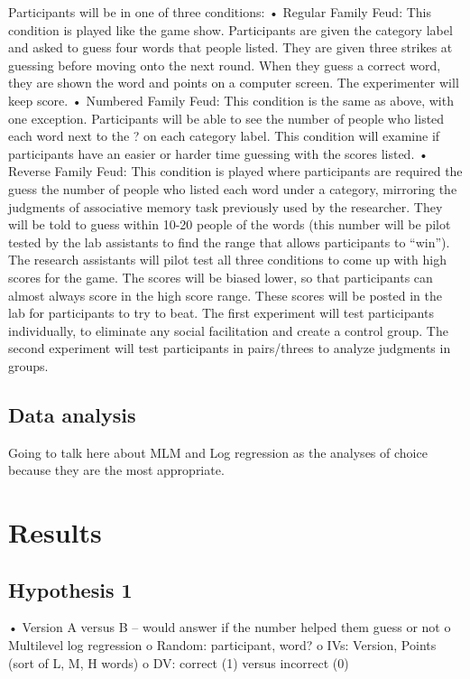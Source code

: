 \documentclass[man]{apa6}
\theoremstyle{definition}
\theoremstyle{definition}
\theoremstyle{definition}
\theoremstyle{remark}
\begin{document}
Participants will be in one of three conditions: • Regular Family Feud:
This condition is played like the game show. Participants are given the
category label and asked to guess four words that people listed. They
are given three strikes at guessing before moving onto the next round.
When they guess a correct word, they are shown the word and points on a
computer screen. The experimenter will keep score. • Numbered Family
Feud: This condition is the same as above, with one exception.
Participants will be able to see the number of people who listed each
word next to the ? on each category label. This condition will examine
if participants have an easier or harder time guessing with the scores
listed. • Reverse Family Feud: This condition is played where
participants are required the guess the number of people who listed each
word under a category, mirroring the judgments of associative memory
task previously used by the researcher. They will be told to guess
within 10-20 people of the words (this number will be pilot tested by
the lab assistants to find the range that allows participants to
\enquote{win}).\\
The research assistants will pilot test all three conditions to come up
with high scores for the game. The scores will be biased lower, so that
participants can almost always score in the high score range. These
scores will be posted in the lab for participants to try to beat. The
first experiment will test participants individually, to eliminate any
social facilitation and create a control group. The second experiment
will test participants in pairs/threes to analyze judgments in groups.

\subsection{Data analysis}\label{data-analysis}

Going to talk here about MLM and Log regression as the analyses of
choice because they are the most appropriate.

\section{Results}\label{results}

\subsection{Hypothesis 1}\label{hypothesis-1}

• Version A versus B -- would answer if the number helped them guess or
not o Multilevel log regression o Random: participant, word? o IVs:
Version, Points (sort of L, M, H words) o DV: correct (1) versus
incorrect (0)
\end{document}
